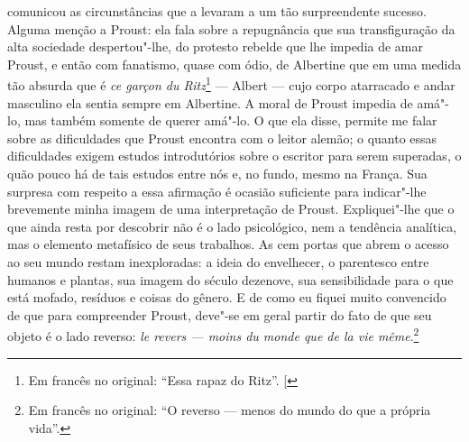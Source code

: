 comunicou as circunstâncias que a levaram a um tão surpreendente
sucesso. Alguma menção a Proust: ela fala sobre a repugnância que sua
transfiguração da alta sociedade despertou"-lhe, do protesto rebelde que
lhe impedia de amar Proust, e então com fanatismo, quase com ódio, de
Albertine que em uma medida tão absurda que é \emph{ce garçon du Ritz}\footnote{Em francês no original: ``Essa rapaz do Ritz''. {[}\versal{N. T.}{]}}
--- Albert --- cujo corpo atarracado e andar masculino ela sentia sempre
em Albertine. A moral de Proust impedia de amá"-lo, mas também somente de
querer amá"-lo. O que ela disse, permite me falar sobre as dificuldades
que Proust encontra com o leitor alemão; o quanto essas dificuldades
exigem estudos introdutórios sobre o escritor para serem superadas, o
quão pouco há de tais estudos entre nós e, no fundo, mesmo na França. Sua
surpresa com respeito a essa afirmação é ocasião suficiente para
indicar"-lhe brevemente minha imagem de uma interpretação de Proust.
Expliquei"-lhe que o que ainda resta por descobrir não é o lado
psicológico, nem a tendência analítica, mas o elemento metafísico de
seus trabalhos. As cem portas que abrem o acesso ao seu mundo restam
inexploradas: a ideia do envelhecer, o parentesco entre humanos e
plantas, sua imagem do século dezenove, sua sensibilidade para o que
está mofado, resíduos e coisas do gênero. E de como eu fiquei muito
convencido de que para compreender Proust, deve"-se em geral partir do
fato de que seu objeto é o lado reverso: \emph{le revers --- moins du
monde que de la vie même}.\footnote{Em francês no original: ``O reverso --- menos do mundo do
  que a própria vida''. \versal{[N. T.]}}

